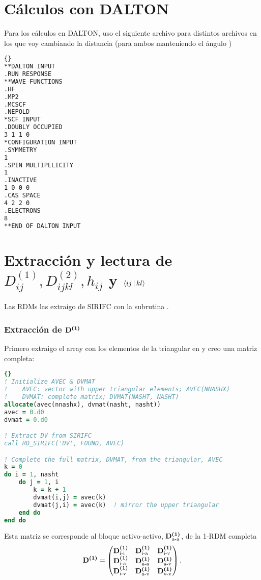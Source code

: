 \section{Cálculos con DALTON}
Para los cálculos en DALTON, uso el siguiente archivo  para distintos
archivos  en los que voy cambiando la distancia  
(para ambos  manteniendo el ángulo )
\begin{lstlisting}[language=bash]{}
**DALTON INPUT
.RUN RESPONSE
**WAVE FUNCTIONS
.HF
.MP2
.MCSCF
.NEPOLD
*SCF INPUT
.DOUBLY OCCUPIED
3 1 1 0
*CONFIGURATION INPUT
.SYMMETRY
1
.SPIN MULTIPLLICITY
1
.INACTIVE
1 0 0 0
.CAS SPACE
4 2 2 0
.ELECTRONS
8
**END OF DALTON INPUT
\end{lstlisting}

\section{Extracción y lectura de $D^{(1)}_{ij}, D^{(2)}_{ijkl}, h_{ij}$ y $\Braket{ij | kl}$}
Las RDMs las extraigo de SIRIFC con la subrutina .

\subsubsection{Extracción de $\boldsymbol{\mathrm{D^{(1)}}}$} %

Primero extraigo el array con los elementos de la triangular en 
y creo una matriz  completa:
\begin{lstlisting}[language=fortran]{}
! Initialize AVEC & DVMAT
!    AVEC: vector with upper triangular elements; AVEC(NNASHX)
!    DVMAT: complete matrix; DVMAT(NASHT, NASHT)
allocate(avec(nnashx), dvmat(nasht, nasht))
avec = 0.d0
dvmat = 0.d0

! Extract DV from SIRIFC
call RD_SIRIFC('DV', FOUND, AVEC)

! Complete the full matrix, DVMAT, from the triangular, AVEC
k = 0
do i = 1, nasht
    do j = 1, i
        k = k + 1
        dvmat(i,j) = avec(k)
        dvmat(j,i) = avec(k)  ! mirror the upper triangular
    end do
end do
\end{lstlisting}

Esta matriz se corresponde al bloque activo-activo, $\boldsymbol{\mathrm{D^{(1)}_{\text{a-a}}}}$,
de la  1-RDM completa 
\begin{equation}
    \boldsymbol{\mathrm{D^{(1)}}} =
    \begin{pmatrix}
        \boldsymbol{\mathrm{D^{(1)}_{\text{i-i}}}} & \boldsymbol{\mathrm{D^{(1)}_{\text{i-a}}}} & \boldsymbol{\mathrm{D^{(1)}_{\text{i-v}}}} \\
        \boldsymbol{\mathrm{D^{(1)}_{\text{i-a}}}} & \boldsymbol{\mathrm{D^{(1)}_{\text{a-a}}}} & \boldsymbol{\mathrm{D^{(1)}_{\text{a-v}}}} \\
        \boldsymbol{\mathrm{D^{(1)}_{\text{i-v}}}} & \boldsymbol{\mathrm{D^{(1)}_{\text{a-v}}}} & \boldsymbol{\mathrm{D^{(1)}_{\text{v-v}}}} \\
    \end{pmatrix}
    .
\end{equation}

